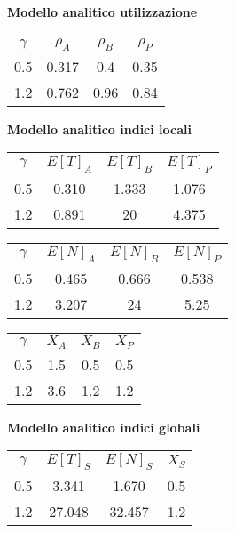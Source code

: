 \textbf{Modello analitico utilizzazione}\\
\begin{table}[!htbp]
    \centering
    \begin{tabular}{cccc}
        $\gamma$ & $\rho_{A}$ & $\rho_{B}$ & $\rho_{P}$ \\         
        0.5 & 0.317 & 0.4 & 0.35 \\
        1.2 & 0.762 & 0.96 & 0.84 \\
    \end{tabular}
    \label{tab:rho_values}
\end{table}

\textbf{Modello analitico indici locali}\\

\begin{table}[!htbp]
    \centering
    \begin{tabular}{cccc}
        $\gamma$ & $E[T]_{A}$ & $E[T]_{B}$ & $E[T]_{P}$ \\         
        0.5 & 0.310 & 1.333 & 1.076 \\
        1.2 & 0.891 & 20 & 4.375 \\
    \end{tabular}
    \label{tab:et_values}
\end{table}
\begin{table}[!htbp]
    \centering
    \begin{tabular}{cccc}
        $\gamma$ & $E[N]_{A}$ & $E[N]_{B}$ & $E[N]_{P}$ \\         
        0.5 & 0.465 & 0.666 & 0.538 \\
        1.2 & 3.207 & 24 & 5.25 \\
    \end{tabular}
    \label{tab:en_values}
\end{table}
\begin{table}[!htbp]
    \centering
    \begin{tabular}{cccc}
        $\gamma$ & $X_{A}$ & $X_{B}$ & $X_{P}$ \\         
        0.5 & 1.5 & 0.5 & 0.5 \\
        1.2 & 3.6 & 1.2 & 1.2 \\
    \end{tabular}
    \label{tab:x_values}
\end{table}

\textbf{Modello analitico indici globali}
\begin{table}[!htbp]
    \centering
    \begin{tabular}{cccc}
        $\gamma$ & $E[T]_{S}$ & $E[N]_{S}$ & $X_{S}$ \\         
        0.5 & 3.341 & 1.670 & 0.5 \\
        1.2 & 27.048 & 32.457 & 1.2 \\
    \end{tabular}
    \label{tab:et_en_x_values_last}
\end{table}